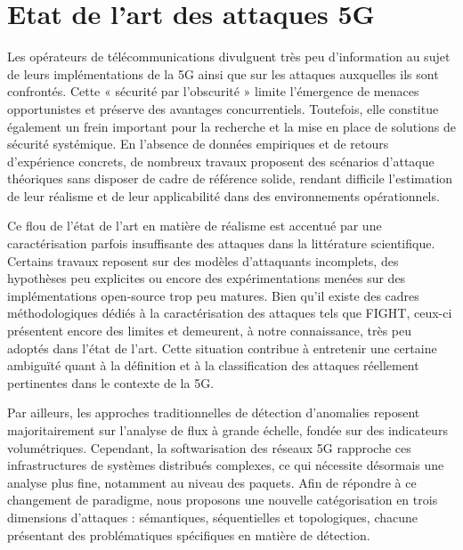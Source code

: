 \documentclass[a4paper,11pt,twoside]{StyleThese}
\providecommand{\minitoc}{}
\providecommand{\dominitoc}{}
\providecommand{\faketableofcontents}{}
\begin{document}
\dominitoc
\faketableofcontents

\fi

\chapter{Etat de l'art des attaques 5G}
\minitoc

Les opérateurs de télécommunications divulguent très peu d'information au sujet de leurs implémentations de la 5G ainsi que sur les attaques auxquelles ils sont confrontés. Cette « sécurité par l’obscurité » limite l’émergence de menaces opportunistes et préserve des avantages concurrentiels. Toutefois, elle constitue également un frein important pour la recherche et la mise en place de solutions de sécurité systémique. En l’absence de données empiriques et de retours d’expérience concrets, de nombreux travaux proposent des scénarios d’attaque théoriques sans disposer de cadre de référence solide, rendant difficile l'estimation de leur réalisme et de leur applicabilité dans des environnements opérationnels.

Ce flou de l'état de l'art en matière de réalisme est accentué par une caractérisation parfois insuffisante des attaques dans la littérature scientifique. Certains travaux reposent sur des modèles d’attaquants incomplets, des hypothèses peu explicites ou encore des expérimentations menées sur des implémentations open-source trop peu matures. Bien qu’il existe des cadres méthodologiques dédiés à la caractérisation des attaques tels que FIGHT, ceux-ci présentent encore des limites et demeurent, à notre connaissance, très peu adoptés dans l’état de l’art. Cette situation contribue à entretenir une certaine ambiguïté quant à la définition et à la classification des attaques réellement pertinentes dans le contexte de la 5G.

Par ailleurs, les approches traditionnelles de détection d’anomalies reposent majoritairement sur l’analyse de flux à grande échelle, fondée sur des indicateurs volumétriques. Cependant, la softwarisation des réseaux 5G rapproche ces infrastructures de systèmes distribués complexes, ce qui nécessite désormais une analyse plus fine, notamment au niveau des paquets. Afin de répondre à ce changement de paradigme, nous proposons une nouvelle catégorisation en trois dimensions d'attaques : sémantiques, séquentielles et topologiques, chacune présentant des problématiques spécifiques en matière de détection.
\end{document}
